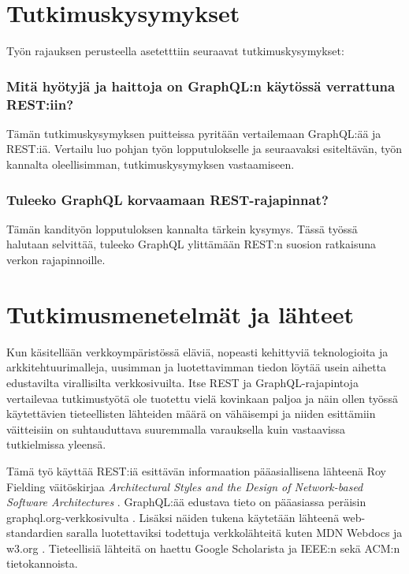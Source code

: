 
\section{Tutkimuskysymykset}\label{Alaotsikko}

Työn rajauksen perusteella asetetttiin seuraavat tutkimuskysymykset:

\subsubsection{Mitä hyötyjä ja haittoja on GraphQL:n käytössä verrattuna REST:iin?}

Tämän tutkimuskysymyksen puitteissa pyritään vertailemaan GraphQL:ää ja REST:iä. Vertailu luo pohjan työn lopputulokselle ja seuraavaksi esiteltävän, työn kannalta oleellisimman, tutkimuskysymyksen vastaamiseen.


\subsubsection{Tuleeko GraphQL korvaamaan REST-rajapinnat?}

Tämän kandityön lopputuloksen kannalta tärkein kysymys. Tässä työssä halutaan selvittää, tuleeko GraphQL ylittämään REST:n suosion ratkaisuna verkon rajapinnoille.



\section{Tutkimusmenetelmät ja lähteet}

Kun käsitellään verkkoympäristössä eläviä, nopeasti kehittyviä teknologioita ja arkkitehtuurimalleja, uusimman ja luotettavimman tiedon löytää usein aihetta edustavilta virallisilta verkkosivuilta. Itse REST ja GraphQL-rajapintoja vertailevaa tutkimustyötä ole tuotettu vielä kovinkaan paljoa ja näin ollen työssä käytettävien tieteellisten lähteiden määrä on vähäisempi ja niiden esittämiin väitteisiin on suhtauduttava suuremmalla varauksella kuin vastaavissa tutkielmissa yleensä.

Tämä työ käyttää REST:iä esittävän informaation pääasiallisena lähteenä Roy Fielding väitöskirjaa \textit{Architectural Styles and the Design of Network-based Software Architectures} \cite{FieldingRThesis}. GraphQL:ää edustava tieto on pääasiassa peräisin graphql.org-verkkosivulta \cite{graphqlorg}. Lisäksi näiden tukena käytetään lähteenä web-standardien saralla luotettaviksi todettuja verkkolähteitä kuten MDN Webdocs ja w3.org \cite{mdn, FactsAboutW3C}. Tieteellisiä lähteitä on haettu Google Scholarista ja IEEE:n sekä ACM:n tietokannoista.